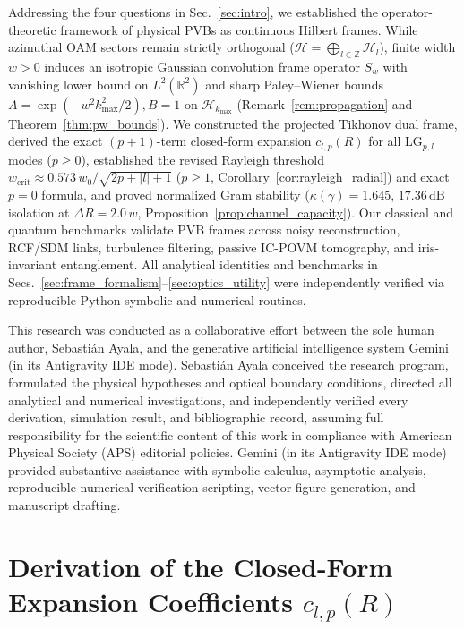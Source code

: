 \documentclass[aps,pra,onecolumn,notitlepage,11pt,tightenlines,amsmath,amssymb,floatfix,longbibliography]{revtex4-2}
\providecommand{\abs}[1]{\lvert#1\rvert}
\begin{document}
Addressing the four questions in Sec.~\ref{sec:intro}, we established the operator-theoretic framework of physical PVBs as continuous Hilbert frames. While azimuthal OAM sectors remain strictly orthogonal ($\mathcal{H} = \bigoplus_{l\in\mathbb{Z}}\mathcal{H}_l$), finite width $w > 0$ induces an isotropic Gaussian convolution frame operator $S_w$ with vanishing lower bound on $L^2(\mathbb{R}^2)$ and sharp Paley--Wiener bounds $A = \exp(-w^2 k_{\max}^2/2), B = 1$ on $\mathcal{H}_{k_{\max}}$ (Remark~\ref{rem:propagation} and Theorem~\ref{thm:pw_bounds}). We constructed the projected Tikhonov dual frame, derived the exact $(p+1)$-term closed-form expansion $c_{l,p}(R)$ for all $\mathrm{LG}_{p,l}$ modes ($p \ge 0$), established the revised Rayleigh threshold $w_{\mathrm{crit}} \approx 0.573\,w_0/\sqrt{2p+\abs{l}+1}$ ($p \ge 1$, Corollary~\ref{cor:rayleigh_radial}) and exact $p=0$ formula, and proved normalized Gram stability ($\kappa(\gamma) = 1.645$, $17.36\,\mathrm{dB}$ isolation at $\Delta R = 2.0\,w$, Proposition~\ref{prop:channel_capacity}). Our classical and quantum benchmarks validate PVB frames across noisy reconstruction, RCF/SDM links, turbulence filtering, passive IC-POVM tomography, and iris-invariant entanglement. All analytical identities and benchmarks in Secs.~\ref{sec:frame_formalism}--\ref{sec:optics_utility} were independently verified via reproducible Python symbolic and numerical routines.

\begin{acknowledgments}
This research was conducted as a collaborative effort between the sole human author, Sebasti\'an Ayala, and the generative artificial intelligence system Gemini (in its Antigravity IDE mode). Sebasti\'an Ayala conceived the research program, formulated the physical hypotheses and optical boundary conditions, directed all analytical and numerical investigations, and independently verified every derivation, simulation result, and bibliographic record, assuming full responsibility for the scientific content of this work in compliance with American Physical Society (APS) editorial policies. Gemini (in its Antigravity IDE mode) provided substantive assistance with symbolic calculus, asymptotic analysis, reproducible numerical verification scripting, vector figure generation, and manuscript drafting.
\end{acknowledgments}

\appendix
\section{Derivation of the Closed-Form Expansion Coefficients \texorpdfstring{$c_{l,p}(R)$}{c\_\{l,p\}(R)}}
\label{app:lg_expansion}
\end{document}
